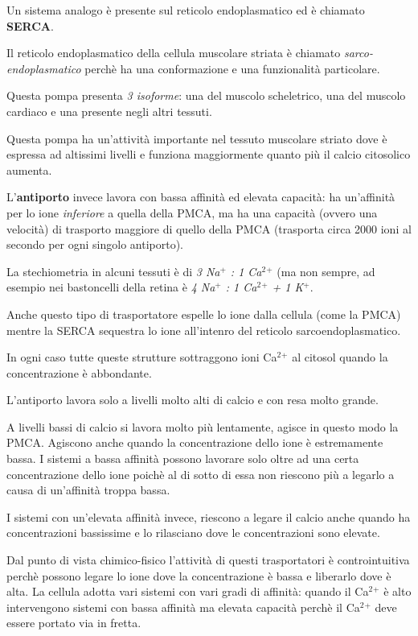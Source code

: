 \documentclass[]{article}
\begin{document}
Un sistema analogo è presente sul reticolo endoplasmatico ed è chiamato
\textbf{SERCA}.

Il reticolo endoplasmatico della cellula muscolare striata è chiamato
\emph{sarco-endoplasmatico} perchè ha una conformazione e una
funzionalità particolare.

Questa pompa presenta \emph{3 isoforme}: una del muscolo scheletrico,
una del muscolo cardiaco e una presente negli altri tessuti.

Questa pompa ha un'attività importante nel tessuto muscolare striato
dove è espressa ad altissimi livelli e funziona maggiormente quanto più
il calcio citosolico aumenta.

L'\textbf{antiporto} invece lavora con bassa affinità ed elevata
capacità: ha un'affinità per lo ione \emph{inferiore} a quella della
PMCA, ma ha una capacità (ovvero una velocità) di trasporto maggiore di
quello della PMCA (trasporta circa 2000 ioni al secondo per ogni singolo
antiporto).

La stechiometria in alcuni tessuti è di \emph{3 Na\(^+\) : 1
Ca\(^2\)\(^+\)} (ma non sempre, ad esempio nei bastoncelli della retina
è \emph{4 Na\(^+\) : 1 Ca\(^2\)\(^+\) + 1 K\(^+\)}.

Anche questo tipo di trasportatore espelle lo ione dalla cellula (come
la PMCA) mentre la SERCA sequestra lo ione all'intenro del reticolo
sarcoendoplasmatico.

In ogni caso tutte queste strutture sottraggono ioni Ca\(^2\)\(^+\) al
citosol quando la concentrazione è abbondante.

L'antiporto lavora solo a livelli molto alti di calcio e con resa molto
grande.

A livelli bassi di calcio si lavora molto più lentamente, agisce in
questo modo la PMCA. Agiscono anche quando la concentrazione dello ione
è estremamente bassa. I sistemi a bassa affinità possono lavorare solo
oltre ad una certa concentrazione dello ione poichè al di sotto di essa
non riescono più a legarlo a causa di un'affinità troppa bassa.

I sistemi con un'elevata affinità invece, riescono a legare il calcio
anche quando ha concentrazioni bassissime e lo rilasciano dove le
concentrazioni sono elevate.

Dal punto di vista chimico-fisico l'attività di questi trasportatori è
controintuitiva perchè possono legare lo ione dove la concentrazione è
bassa e liberarlo dove è alta. La cellula adotta vari sistemi con vari
gradi di affinità: quando il Ca\(^2\)\(^+\) è alto intervengono sistemi
con bassa affinità ma elevata capacità perchè il Ca\(^2\)\(^+\) deve
essere portato via in fretta.
\end{document}
